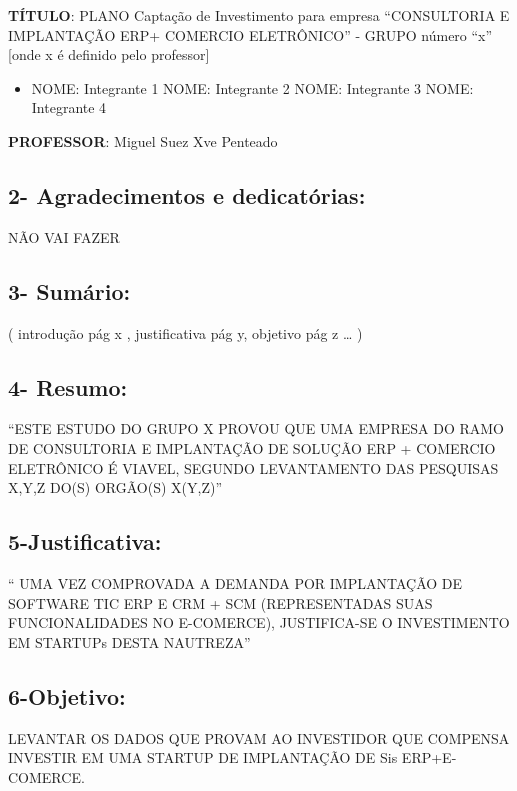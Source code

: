 \documentclass[
]{book}
\providecommand{\tightlist}{%
  \setlength{\itemsep}{0pt}\setlength{\parskip}{0pt}}
\begin{document}
\textbf{TÍTULO}: PLANO Captação de Investimento para empresa ``CONSULTORIA E IMPLANTAÇÃO ERP+ COMERCIO ELETRÔNICO'' - GRUPO número ``x'' {[}onde x é definido pelo professor{]}

\begin{itemize}
\tightlist
\item
  NOME: Integrante 1 NOME: Integrante 2 NOME: Integrante 3 NOME: Integrante 4
\end{itemize}

\textbf{PROFESSOR}: Miguel Suez Xve Penteado

\subsection{2- Agradecimentos e dedicatórias:}\label{agradecimentos-e-dedicatuxf3rias}

NÃO VAI FAZER

\subsection{3- Sumário:}\label{sumuxe1rio}

( introdução pág x , justificativa pág y, objetivo pág z \ldots{} )

\subsection{4- Resumo:}\label{resumo}

``ESTE ESTUDO DO GRUPO X PROVOU QUE UMA EMPRESA DO RAMO DE CONSULTORIA E IMPLANTAÇÃO DE SOLUÇÃO ERP + COMERCIO ELETRÔNICO É VIAVEL, SEGUNDO LEVANTAMENTO DAS PESQUISAS X,Y,Z DO(S) ORGÃO(S) X(Y,Z)''

\subsection{5-Justificativa:}\label{justificativa}

`` UMA VEZ COMPROVADA A DEMANDA POR IMPLANTAÇÃO DE SOFTWARE TIC ERP E CRM + SCM (REPRESENTADAS SUAS FUNCIONALIDADES NO E-COMERCE), JUSTIFICA-SE O INVESTIMENTO EM STARTUPs DESTA NAUTREZA''

\subsection{6-Objetivo:}\label{objetivo}

LEVANTAR OS DADOS QUE PROVAM AO INVESTIDOR QUE COMPENSA INVESTIR EM UMA STARTUP DE IMPLANTAÇÃO DE Sis ERP+E-COMERCE.
\end{document}
